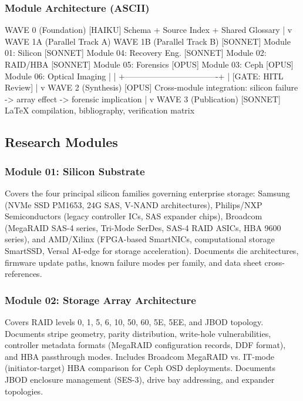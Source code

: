 \documentclass[11pt,letterpaper]{article}
\begin{document}
\subsubsection{Module Architecture (ASCII)}

\begin{asciibox}
WAVE 0 (Foundation)
   [HAIKU] Schema + Source Index + Shared Glossary
         |
         v
WAVE 1A (Parallel Track A)          WAVE 1B (Parallel Track B)
   [SONNET] Module 01: Silicon       [SONNET] Module 04: Recovery Eng.
   [SONNET] Module 02: RAID/HBA      [SONNET] Module 05: Forensics
   [OPUS]   Module 03: Ceph          [OPUS]   Module 06: Optical Imaging
         |                                  |
         +----------------------------------+
                        |
                 [GATE: HITL Review]
                        |
                        v
WAVE 2 (Synthesis)
   [OPUS] Cross-module integration: silicon failure -> array effect -> forensic implication
         |
         v
WAVE 3 (Publication)
   [SONNET] LaTeX compilation, bibliography, verification matrix
\end{asciibox}

\subsection{Research Modules}

\subsubsection{Module 01: Silicon Substrate}

Covers the four principal silicon families governing enterprise storage: Samsung (NVMe SSD PM1653, 24G SAS, V-NAND architectures), Philips/NXP Semiconductors (legacy controller ICs, SAS expander chips), Broadcom (MegaRAID SAS-4 series, Tri-Mode SerDes, SAS-4 RAID ASICs, HBA 9600 series), and AMD/Xilinx (FPGA-based SmartNICs, computational storage SmartSSD, Versal AI-edge for storage acceleration). Documents die architectures, firmware update paths, known failure modes per family, and data sheet cross-references.

\subsubsection{Module 02: Storage Array Architecture}

Covers RAID levels 0, 1, 5, 6, 10, 50, 60, 5E, 5EE, and JBOD topology. Documents stripe geometry, parity distribution, write-hole vulnerabilities, controller metadata formats (MegaRAID configuration records, DDF format), and HBA passthrough modes. Includes Broadcom MegaRAID vs. IT-mode (initiator-target) HBA comparison for Ceph OSD deployments. Documents JBOD enclosure management (SES-3), drive bay addressing, and expander topologies.
\end{document}
